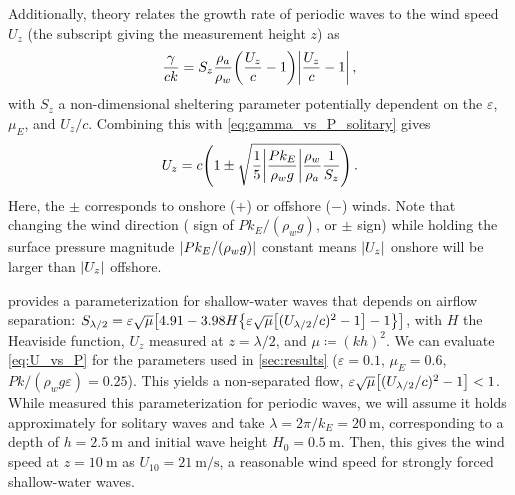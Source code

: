 \documentclass{jfm}
\renewcommand*{\epsilon}{\varepsilon}
\begin{document}
Additionally, \citet{jeffreys1925formation} theory relates the growth
rate of periodic waves to the wind speed $U_z$ (the subscript giving the
measurement height $z$) as
\begin{equation}
  \frac{\gamma}{c k} = S_z \frac{\rho_a}{\rho_w}
    \pqty{\frac{U_z}{c}-1} \abs{\frac{U_z}{c}-1} \,,
  \label{eq:gamma_vs_u_jeffreys}
\end{equation}
with $S_z$ a non-dimensional sheltering parameter potentially dependent
on the $\epsilon$, $\mu_E$, and $U_z/c$.
Combining this with \cref{eq:gamma_vs_P_solitary} gives
\begin{equation}
  U_z = c \pqty{1 \pm \sqrt{\frac{1}{5} \abs{\frac{P k_E}{\rho_w g}}
    \frac{\rho_w}{\rho_a} \frac{1}{S_z}}} \,.
  \label{eq:U_vs_P}
\end{equation}
Here, the $\pm$ corresponds to onshore ($+$) or offshore ($-$) winds.
Note that changing the wind direction (\ie{} sign of $Pk_E/(\rho_w g)$,
or $\pm$ sign) while holding the surface pressure magnitude
$\abs{Pk_E/(\rho_w g)}$ constant means $\abs{U_z}$ onshore will be
larger than $\abs{U_z}$ offshore.

 provides a parameterization for shallow-water
waves that depends on airflow separation: $S_{\lambda/2} =
\epsilon \sqrt{\mu} \bqty{4.91-3.98 H\Bqty{\epsilon \sqrt{\mu}
\bqty{(U_{\lambda/2}/c)^2-1} - 1}}$, with $H$ the Heaviside function,
$U_z$ measured at $z=\lambda/2$, and $\mu \coloneqq (kh)^2$.
We can evaluate \cref{eq:U_vs_P} for the parameters used in
\cref{sec:results} ($\epsilon=0.1$, $\mu_E = 0.6$, $Pk/(\rho_w g
\epsilon) = 0.25$). This yields a non-separated flow,
$\epsilon \sqrt{\mu} \bqty{(U_{\lambda/2}/c)^2-1} < 1$.
While \citet{donelan2006wave} measured this parameterization for
periodic waves, we will assume it holds approximately for solitary waves
and take $\lambda = 2 \pi/k_E = \SI{20}{\meter}$, corresponding to a
depth of $h = \SI{2.5}{\meter}$ and initial wave height $H_0 =
\SI{0.5}{\meter}$.
Then, this gives the wind speed at $z=\SI{10}{\meter}$ as $U_{10} =
\SI{21}{\meter\per\second}$, a reasonable wind speed for strongly forced
shallow-water waves.
\end{document}
